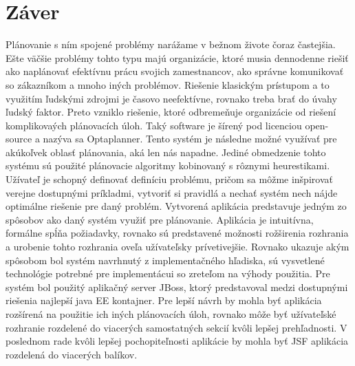 \chapter{Záver}\label{zaver}
Plánovanie s ním spojené problémy narážame v bežnom živote čoraz častejšia. Ešte väčšie problémy tohto typu majú organizácie, ktoré musia dennodenne riešiť ako naplánovať efektívnu prácu svojich zamestnancov, ako správne komunikovať so zákazníkom a mnoho iných problémov. Riešenie klasickým prístupom a to využitím ľudskými zdrojmi je časovo neefektívne, rovnako treba brať do úvahy ľudský faktor. Preto vzniklo riešenie, ktoré odbremeňuje organizácie od riešení komplikovaých plánovacích úloh. Taký software je šírený pod licenciou open-source a nazýva sa Optaplanner. Tento systém je následne možné využívať pre akúkoľvek oblasť plánovania, aká len nás napadne. Jediné obmedzenie tohto systému sú použité plánovacie algoritmy kobinovaný s rôznymi heurestikami. Užívateľ je schopný definovať definíciu problému, pričom sa môžme inšpirovať verejne dostupnými príkladmi, vytvoriť si pravidlá a nechať systém nech nájde optimálne riešenie pre daný problém. Vytvorená aplikácia predstavuje jedným zo spôsobov ako daný systém využiť pre plánovanie. Aplikácia je intuitívna, formálne spĺňa požiadavky, rovnako sú predstavené možnosti rožširenia rozhrania a urobenie tohto rozhrania oveľa užívateľsky prívetivejšie.  Rovnako ukazuje akým spôsobom bol systém navrhnutý z implementačného hľadiska, sú vysvetlené technológie potrebné pre implementácui so zreteľom na výhody použitia. Pre systém bol použitý aplikačný server JBoss, ktorý predstavoval medzi dostupnými riešenia najlepší java EE kontajner. Pre lepší návrh by mohla byť aplikácia rozšírená na použitie ich iných plánovacích úloh, rovnako môže byť užívateľské rozhranie rozdelené do viacerých samostatných sekcií kvôli lepšej prehľadnosti. V poslednom rade kvôli lepšej pochopiteľnosti aplikácie by mohla byť JSF aplikácia rozdelená do viacerých balíkov.


